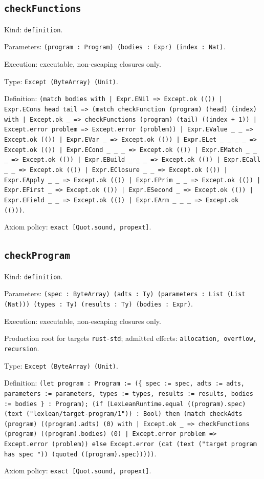 \documentclass[11pt]{article}
\begin{document}
\subsection*{\texttt{checkFunctions}}
\noindent Kind: \texttt{definition}.\par
\noindent Parameters: \texttt{(program : Program) (bodies : Expr) (index : Nat)}.\par
\noindent Execution: executable, non-escaping closures only.\par
\noindent Type: \texttt{Except (ByteArray) (Unit)}.\par
\noindent Definition: \texttt{(match bodies with | Expr.ENil => Except.ok (()) | Expr.ECons head tail => (match checkFunction (program) (head) (index) with | Except.ok \_ => checkFunctions (program) (tail) ((index + 1)) | Except.error problem => Except.error (problem)) | Expr.EValue \_ \_ => Except.ok (()) | Expr.EVar \_ => Except.ok (()) | Expr.ELet \_ \_ \_ \_ => Except.ok (()) | Expr.ECond \_ \_ \_ => Except.ok (()) | Expr.EMatch \_ \_ \_ => Except.ok (()) | Expr.EBuild \_ \_ \_ => Except.ok (()) | Expr.ECall \_ \_ => Except.ok (()) | Expr.EClosure \_ \_ => Except.ok (()) | Expr.EApply \_ \_ => Except.ok (()) | Expr.EPrim \_ \_ => Except.ok (()) | Expr.EFirst \_ => Except.ok (()) | Expr.ESecond \_ => Except.ok (()) | Expr.EField \_ \_ => Except.ok (()) | Expr.EArm \_ \_ \_ => Except.ok (()))}.\par
\noindent Axiom policy: \texttt{exact [Quot.sound, propext]}.\par
\subsection*{\texttt{checkProgram}}
\noindent Kind: \texttt{definition}.\par
\noindent Parameters: \texttt{(spec : ByteArray) (adts : Ty) (parameters : List (List (Nat))) (types : Ty) (results : Ty) (bodies : Expr)}.\par
\noindent Execution: executable, non-escaping closures only.\par
\noindent Production root for targets \texttt{rust-std}; admitted effects: \texttt{allocation, overflow, recursion}.\par
\noindent Type: \texttt{Except (ByteArray) (Unit)}.\par
\noindent Definition: \texttt{(let program : Program := (\{ spec := spec, adts := adts, parameters := parameters, types := types, results := results, bodies := bodies \} : Program); (if (LexLeanRuntime.equal ((program).spec) (text ("lexlean/target-program/1")) : Bool) then (match checkAdts (program) ((program).adts) (0) with | Except.ok \_ => checkFunctions (program) ((program).bodies) (0) | Except.error problem => Except.error (problem)) else Except.error (cat (text ("target program has spec ")) (quoted ((program).spec)))))}.\par
\noindent Axiom policy: \texttt{exact [Quot.sound, propext]}.\par
\end{document}
